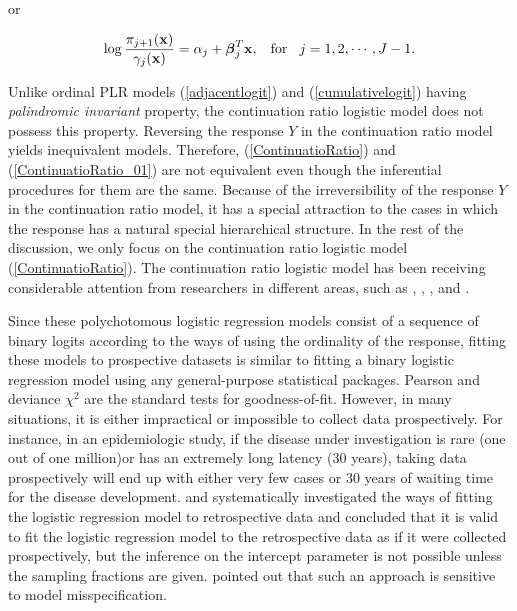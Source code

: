 \documentclass[12]{interact}
\theoremstyle{plain}%
\theoremstyle{definition}
\theoremstyle{remark}
\begin{document}
or

\begin{equation}
	\log \frac{\pi_{j+1}(\mathbf{x})}{\gamma_{j}(\mathbf{x})}=\alpha_j +  {\mbox{\boldmath $\beta$}}_j^{T}\mathbf{x}, \hspace{3mm}\mbox{for}\hspace{3mm} j =1, 2, \cdots, J-1. \label{ContinuatioRatio_01}
\end{equation}

Unlike ordinal PLR models (\ref{adjacentlogit}) and (\ref{cumulativelogit}) having {\em palindromic invariant} property, the continuation ratio logistic model does not possess this property. Reversing the response $Y$ in the continuation ratio model yields inequivalent models. Therefore, (\ref{ContinuatioRatio}) and (\ref{ContinuatioRatio_01}) are not equivalent even though the inferential procedures for them are the same. Because of the irreversibility of the response $Y$ in the continuation ratio model, it has a special attraction to the cases in which the response has a natural special hierarchical structure. In the rest of the discussion, we only focus on the continuation ratio logistic model (\ref{ContinuatioRatio}). The continuation ratio logistic model has been receiving considerable attention from researchers in different areas, such as \cite{Hemker-MeasurementContinuationRatio-2001}, \cite{Tutz-SeqCateReg-CSDA-1991}, \cite{Kvist-Gislason-Thyregod-2000}, \cite{Rindorf-Lewy-2001} and \cite{Cox-StatMed-1988}.

Since these polychotomous logistic regression models consist of a sequence of binary logits according to the ways of using the ordinality of the response, fitting these models to prospective datasets is similar to fitting a binary logistic regression model using any general-purpose statistical packages. Pearson and deviance $\chi^2$ are the standard tests for goodness-of-fit. However, in many situations, it is either impractical or impossible to collect data prospectively. For instance, in an epidemiologic study, if the disease under investigation is rare (one out of one million)or has an extremely long latency (30 years), taking data prospectively will end up with either very few cases or 30 years of waiting time for the disease development. \cite{Farewell-LogisticRetrospective-Biometrika-1979} and \cite{Prentice-Pyke-LogisticCasecontrol-Biometrika-1979} systematically investigated the ways of fitting the logistic regression model to retrospective data and concluded that it is valid to fit the logistic regression model to the retrospective data as if it were collected prospectively, but the inference on the intercept parameter is not possible unless the sampling fractions are given. \cite{Scott-Wild-CaseControl-ChoiceBasedSampling-JRSSSB-1986} pointed out that such an approach is sensitive to model misspecification.
\end{document}
